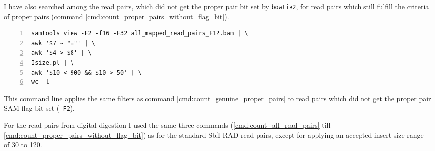 \documentclass[a4paper,12pt,times,print,index,custombib,custommargin]{PhDThesisPSnPDF}\usepackage[]{graphicx}\usepackage[]{color}
\begin{document}
%
I have also searched among the read pairs, which did not get the \gls{proper pair} bit set by \texttt{bowtie2}, for read pairs which still fulfill the criteria of proper pairs (command \ref{cmd:count_proper_pairs_without_flag_bit}).
%
\begin{cmd}
\captionsetup{type=cmd}
\begin{Verbatim}[fontsize=\scriptsize, formatcom=\color{darkgray}, numbers=left]
samtools view -F2 -f16 -F32 all_mapped_read_pairs_F12.bam | \
awk '$7 ~ "="' | \
awk '$4 > $8' | \
Isize.pl | \
awk '$10 < 900 && $10 > 50' | \
wc -l
\end{Verbatim}
\caption{\small This command line applies the same filters as command \ref{cmd:count_genuine_proper_pairs} to read pairs which did not get the \gls{proper pair} SAM flag bit set (\texttt{-F2}).}
\label{cmd:count_proper_pairs_without_flag_bit}
\end{cmd}
%
For the read pairs from digital digestion I used the same three commands (\ref{cmd:count_all_read_pairs} till \ref{cmd:count_proper_pairs_without_flag_bit}) as for the standard SbfI RAD read pairs, except for applying an accepted insert size range of 30 to 120.
\end{document}
